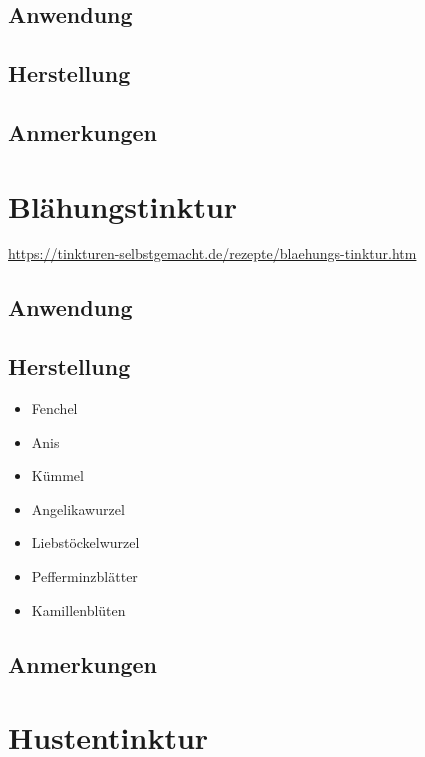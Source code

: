 \subsection{Anwendung}

\subsection{Herstellung}

\subsection{Anmerkungen}







\section{Blähungstinktur}

\cite{tinkturen}  

\url{https://tinkturen-selbstgemacht.de/rezepte/blaehungs-tinktur.htm}

\subsection{Anwendung}


\subsection{Herstellung}



\begin{itemize}
	\item Fenchel
	\item Anis
	\item Kümmel
	\item Angelikawurzel
	\item Liebstöckelwurzel
	\item Pefferminzblätter
	\item Kamillenblüten
\end{itemize}

\subsection{Anmerkungen}




\section{Hustentinktur}

